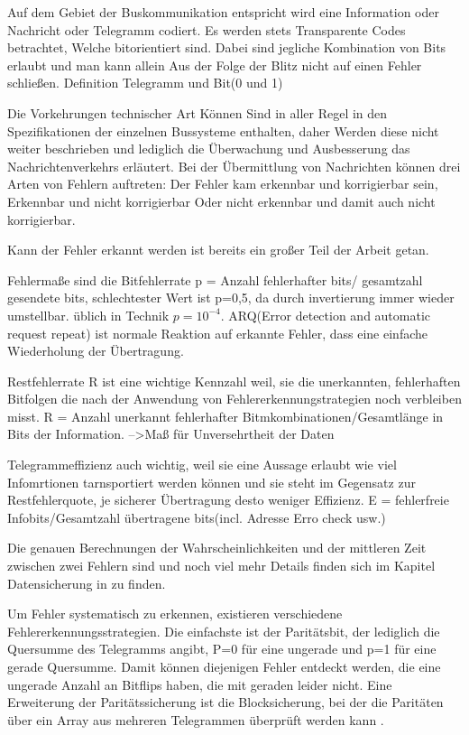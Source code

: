 Auf dem Gebiet der Buskommunikation entspricht wird eine Information oder Nachricht oder Telegramm codiert. Es werden stets Transparente Codes betrachtet, Welche bitorientiert sind. Dabei sind jegliche Kombination von Bits erlaubt und man kann allein Aus der Folge der Blitz nicht auf einen Fehler schließen.
Definition Telegramm und Bit(0 und 1)

Die Vorkehrungen technischer Art Können Sind in aller Regel in den Spezifikationen der einzelnen Bussysteme enthalten, daher Werden diese nicht weiter beschrieben und lediglich die Überwachung und Ausbesserung das Nachrichtenverkehrs erläutert.
Bei der Übermittlung von Nachrichten können drei Arten von Fehlern auftreten:
Der Fehler kam erkennbar und korrigierbar sein,
Erkennbar und nicht korrigierbar
Oder nicht erkennbar und damit auch nicht korrigierbar.

Kann der Fehler erkannt werden ist bereits ein großer Teil der Arbeit getan. 

Fehlermaße sind
die Bitfehlerrate p = Anzahl fehlerhafter bits/ gesamtzahl gesendete bits, schlechtester Wert ist p=0,5, da durch invertierung immer wieder umstellbar. üblich in Technik $p=10^{-4}$.
ARQ(Error detection and automatic request repeat) ist normale Reaktion auf erkannte Fehler, dass eine einfache Wiederholung der Übertragung.

Restfehlerrate R ist eine wichtige Kennzahl weil, sie die unerkannten, fehlerhaften Bitfolgen die nach der Anwendung von Fehlererkennungstrategien noch verbleiben misst. R = Anzahl unerkannt fehlerhafter Bitmkombinationen/Gesamtlänge in Bits der Information.
-->Maß für Unversehrtheit der Daten

Telegrammeffizienz auch wichtig, weil sie eine Aussage erlaubt wie viel Infomrtionen tarnsportiert werden können und sie steht im Gegensatz zur Restfehlerquote, je sicherer Übertragung desto weniger Effizienz. E = fehlerfreie Infobits/Gesamtzahl übertragene bits(incl. Adresse Erro check usw.)
\cite[S.~31ff.]{schn06}

Die genauen Berechnungen der Wahrscheinlichkeiten und der mittleren Zeit zwischen zwei Fehlern sind und noch viel mehr Details finden sich im Kapitel Datensicherung in \cite[S.~31f.]{schn06} zu finden.

Um Fehler systematisch zu erkennen, existieren verschiedene Fehlererkennungsstrategien. Die einfachste ist der Paritätsbit, der lediglich die Quersumme des Telegramms angibt, P=0 für eine ungerade und p=1 für eine gerade Quersumme. Damit können diejenigen Fehler entdeckt werden, die eine ungerade Anzahl an Bitflips haben, die mit geraden leider nicht. Eine Erweiterung der Paritätssicherung ist die Blocksicherung, bei der die Paritäten über ein Array aus mehreren Telegrammen überprüft werden kann \cite[S.~34f.]{schn06}.

